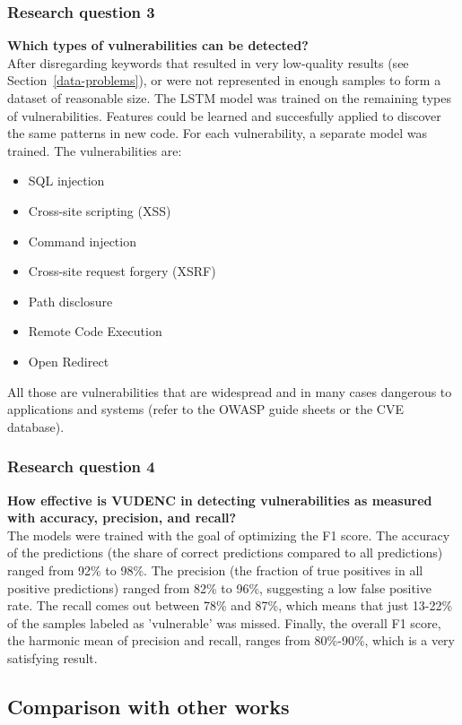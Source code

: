 \documentclass[
a4paper,
pagesize,
pdftex,
12pt,
twoside, %
BCOR=5mm, %
ngerman,
fleqn,
final,
]{scrartcl}
\begin{document}
	\subsubsection{Research question 3}
	\textbf{Which types of vulnerabilities can be detected?}\\
	After disregarding keywords that resulted in very low-quality results (see Section~\ref{data-problems}), or were not represented in enough samples to form a dataset of reasonable size. The LSTM model was trained on the remaining types of vulnerabilities. Features could be learned and succesfully applied to discover the same patterns in new code. For each vulnerability, a separate model was trained. The vulnerabilities are:
	\begin{itemize}
		\item SQL injection
		\item Cross-site scripting (XSS)
		\item Command injection
		\item Cross-site request forgery (XSRF)
		\item Path disclosure
		\item Remote Code Execution
		\item Open Redirect
	\end{itemize}
	All those are vulnerabilities that are widespread and in many cases dangerous to applications and systems (refer  to the OWASP guide sheets or the CVE database). 
	
	\subsubsection{Research question 4}
	\textbf{How effective is VUDENC in detecting vulnerabilities as measured with accuracy, precision, and recall? }\\
	 The models were trained with the goal of optimizing the F1 score. The accuracy of the predictions (the share of correct predictions compared to all predictions) ranged from 92\% to 98\%. The precision (the fraction of true positives in all positive predictions) ranged from 82\% to 96\%, suggesting a low false positive rate. The recall comes out between 78\% and 87\%, which means that just 13-22\% of the samples labeled as 'vulnerable' was missed. Finally, the overall F1 score, the harmonic mean of precision and recall, ranges from 80\%-90\%, which is a very satisfying result.
	
	\subsection{Comparison with other works}
	
\end{document}
